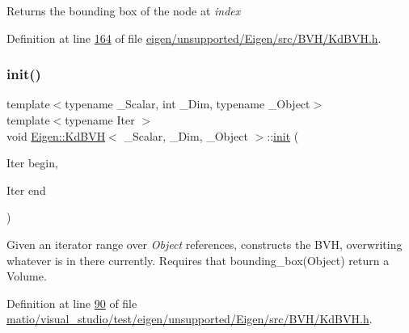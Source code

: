 \begin{DoxyReturn}{Returns}
the bounding box of the node at {\itshape index} 
\end{DoxyReturn}


Definition at line \hyperlink{eigen_2unsupported_2_eigen_2src_2_b_v_h_2_kd_b_v_h_8h_source_l00164}{164} of file \hyperlink{eigen_2unsupported_2_eigen_2src_2_b_v_h_2_kd_b_v_h_8h_source}{eigen/unsupported/\+Eigen/src/\+B\+V\+H/\+Kd\+B\+V\+H.\+h}.

\mbox{\label{class_eigen_1_1_kd_b_v_h_a431eed3c2567a854fb350f0b327d3307}} 
\subsubsection{\texorpdfstring{init()}{init()}\hspace{0.1cm}{\footnotesize\ttfamily [1/4]}}
{\footnotesize\ttfamily template$<$typename \+\_\+\+Scalar, int \+\_\+\+Dim, typename \+\_\+\+Object$>$ \\
template$<$typename Iter $>$ \\
void \hyperlink{class_eigen_1_1_kd_b_v_h}{Eigen\+::\+Kd\+B\+VH}$<$ \+\_\+\+Scalar, \+\_\+\+Dim, \+\_\+\+Object $>$\+::\hyperlink{structinit}{init} (\begin{DoxyParamCaption}\item[{Iter}]{begin,  }\item[{Iter}]{end }\end{DoxyParamCaption})\hspace{0.3cm}{\ttfamily [inline]}}

Given an iterator range over {\itshape Object} references, constructs the B\+VH, overwriting whatever is in there currently. Requires that bounding\+\_\+box(\+Object) return a Volume. 

Definition at line \hyperlink{matio_2visual__studio_2test_2eigen_2unsupported_2_eigen_2src_2_b_v_h_2_kd_b_v_h_8h_source_l00090}{90} of file \hyperlink{matio_2visual__studio_2test_2eigen_2unsupported_2_eigen_2src_2_b_v_h_2_kd_b_v_h_8h_source}{matio/visual\+\_\+studio/test/eigen/unsupported/\+Eigen/src/\+B\+V\+H/\+Kd\+B\+V\+H.\+h}.

\mbox{\label{class_eigen_1_1_kd_b_v_h_a431eed3c2567a854fb350f0b327d3307}} 

